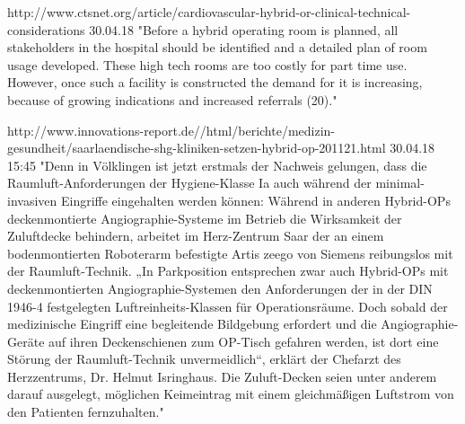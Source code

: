 http://www.ctsnet.org/article/cardiovascular-hybrid-or-clinical-technical-considerations 30.04.18	
	"Before a hybrid operating room is planned, all stakeholders in the hospital should be identified and a detailed plan of room usage developed. These high tech rooms are too costly for part time use. However, once such a facility is constructed the demand for it is increasing, because of growing indications and increased referrals (20)."
	
http://www.innovations-report.de//html/berichte/medizin-gesundheit/saarlaendische-shg-kliniken-setzen-hybrid-op-201121.html  30.04.18 15:45
	"Denn in Völklingen ist jetzt erstmals der Nachweis gelungen, dass die Raumluft-Anforderungen der Hygiene-Klasse Ia auch während der minimal-invasiven Eingriffe eingehalten werden können: Während in anderen Hybrid-OPs deckenmontierte Angiographie-Systeme im Betrieb die Wirksamkeit der Zuluftdecke behindern, arbeitet im Herz-Zentrum Saar der an einem bodenmontierten Roboterarm befestigte Artis zeego von Siemens reibungslos mit der Raumluft-Technik.
	„In Parkposition entsprechen zwar auch Hybrid-OPs mit deckenmontierten Angiographie-Systemen den Anforderungen der in der DIN 1946-4 festgelegten Luftreinheits-Klassen für Operationsräume. Doch sobald der medizinische Eingriff eine begleitende Bildgebung erfordert und die Angiographie-Geräte auf ihren Deckenschienen zum OP-Tisch gefahren werden, ist dort eine Störung der Raumluft-Technik unvermeidlich“, erklärt der Chefarzt des Herzzentrums, Dr. Helmut Isringhaus. Die Zuluft-Decken seien unter anderem darauf ausgelegt, möglichen Keimeintrag mit einem gleichmäßigen Luftstrom von den Patienten fernzuhalten."	

